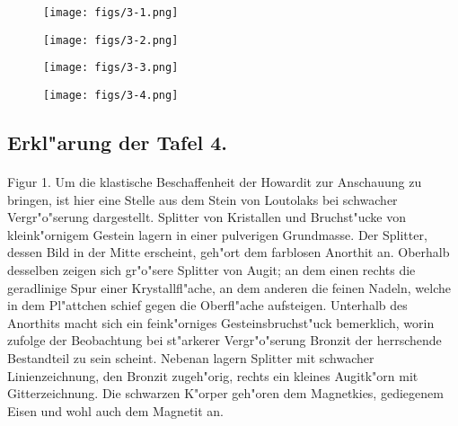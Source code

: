 \documentclass[a4paper, 11pt, oneside, polutonikogreek, german]{article}
\begin{document}
\vspace*{\fill}
\begin{figure}[H]
\centering
\texttt{[image: figs/3-1.png]}
\caption{}
\end{figure}
\vspace*{\fill}
\clearpage

\vspace*{\fill}
\begin{figure}[H]
\centering
\texttt{[image: figs/3-2.png]}
\caption{}
\end{figure}
\vspace*{\fill}
\clearpage

\vspace*{\fill}
\begin{figure}[H]
\centering
\texttt{[image: figs/3-3.png]}
\caption{}
\end{figure}
\vspace*{\fill}
\clearpage

\vspace*{\fill}
\begin{figure}[H]
\centering
\texttt{[image: figs/3-4.png]}
\caption{}
\end{figure}
\vspace*{\fill}
\clearpage

\subsection{Erkl"arung der Tafel 4.}
\paragraph{}
Figur 1. Um die klastische Beschaffenheit der Howardit zur Anschauung zu bringen, ist hier eine Stelle aus dem Stein von Loutolaks bei schwacher Vergr"o"serung dargestellt. Splitter von Kristallen und Bruchst"ucke von kleink"ornigem Gestein lagern in einer pulverigen Grundmasse. Der Splitter, dessen Bild in der Mitte erscheint, geh"ort dem farblosen Anorthit an. Oberhalb desselben zeigen sich gr"o"sere Splitter von Augit; an dem einen rechts die geradlinige Spur einer Krystallfl"ache, an dem anderen die feinen Nadeln, welche in dem Pl"attchen schief gegen die Oberfl"ache aufsteigen. Unterhalb des Anorthits macht sich ein feink"orniges Gesteinsbruchst"uck bemerklich, worin zufolge der Beobachtung bei st"arkerer Vergr"o"serung Bronzit der herrschende Bestandteil zu sein scheint. Nebenan lagern Splitter mit schwacher Linienzeichnung, den Bronzit zugeh"orig, rechts ein kleines Augitk"orn mit Gitterzeichnung. Die schwarzen K"orper geh"oren dem Magnetkies, gediegenem Eisen und wohl auch dem Magnetit an.
\end{document}
